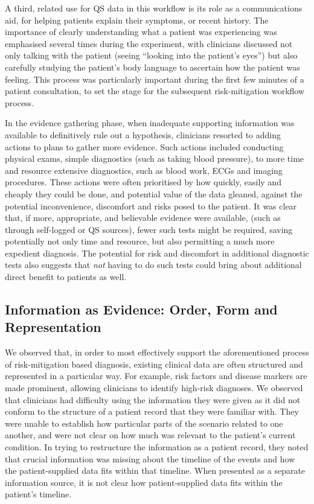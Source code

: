 \documentclass{sigchi}
\begin{document}
A third, related use for QS data in this workflow is its role as a communications aid, for helping patients explain their symptoms, or recent history.  The importance of clearly understanding what a patient was experiencing was emphasised several times during the experiment, with clinicians discussed not only talking with the patient (seeing ``looking into the patient's eyes'') but also carefully studying the patient's body language to ascertain how the patient was feeling.  This process was particularly important during the first few minutes of a patient consultation, to set the stage for the subsequent risk-mitigation workflow process.

In the evidence gathering phase, when inadequate supporting information was available to definitively rule out a hypothesis, clinicians resorted to adding actions to plans to gather more evidence.  Such actions included conducting physical exams, simple diagnostics (such as taking blood pressure), to more time and resource extensive diagnostics, such as blood work, ECGs and imaging procedures.  These actions were often prioritised by how quickly, easily and cheaply they could be done, and potential value of the data gleaned, against the potential inconvenience, discomfort and risks posed to the patient.  It was clear that, if more, appropriate, and believable evidence were available, (such as through self-logged or QS sources), fewer such tests might be required, saving potentially not only time and resource, but also permitting a much more expedient diagnosis.  The potential for risk and discomfort in additional diagnostic tests also suggests that \emph{not} having to do such tests could bring about additional direct benefit to patients as well. 

\subsection{Information as Evidence: \newline Order, Form and Representation}

We observed that, in order to most effectively support the aforementioned process of risk-mitigation based diagnosis, existing clinical data are often structured and represented in a particular way.  For example, risk factors and disease markers are made prominent, allowing clinicians to identify high-risk diagnoses. We observed that clinicians had difficulty using the information they were given as it did not conform to the structure of a patient record that they were familiar with. They were unable to establish how particular parts of the scenario related to one another, and were not clear on how much was relevant to the patient's current condition. In trying to restructure the information as a patient record, they noted that crucial information was missing about the timeline of the events and how the patient-supplied data fits within that timeline. When presented as a separate information source, it is not clear how patient-supplied data fits within the patient's timeline.
\end{document}
